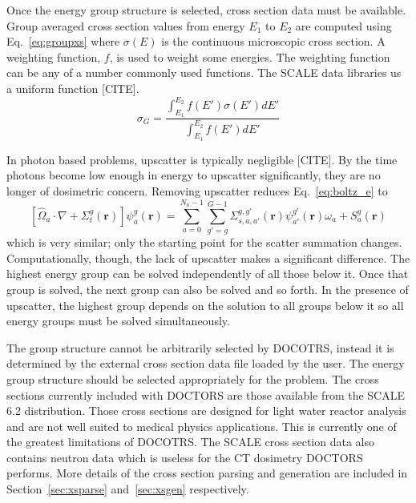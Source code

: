 Once the energy group structure is selected, cross section data must be available. Group averaged cross section values from energy $E_1$ to $E_2$ are computed using Eq.~\ref{eq:groupxs} where $\sigma(E)$ is the continuous microscopic cross section. A weighting function, $f$, is used to weight some energies. The weighting function can be any of a number commonly used functions. The SCALE data libraries us a uniform function [CITE].
\begin{equation}\label{eq:groupxs}
\sigma_G = \frac{\int_{E_1}^{E_2}f(E')\sigma(E') dE'}{\int_{E_1}^{E_2} f(E') dE'}
\end{equation}

In photon based problems, upscatter is typically negligible [CITE]. By the time photons become low enough in energy to upscatter significantly, they are no longer of dosimetric concern. Removing upscatter reduces Eq.~\ref{eq:boltz_e} to
\begin{equation} \label{eq:boltz_e2}
\left[ \hat{\Omega}_a \cdot \nabla + \Sigma_t^g(\boldsymbol{r}) \right]
\psi_{a}^{g}(\boldsymbol{r}) = 
\sum_{a=0}^{N_a-1} \sum_{g'=g}^{G-1} \Sigma_{s, a, a'}^{g, g'}(\boldsymbol{r}) \psi_{a'}^{g'}(\boldsymbol{r}) \omega_a + S_a^g(\boldsymbol{r})
\end{equation}
which is very similar; only the starting point for the scatter summation changes. Computationally, though, the lack of upscatter makes a significant difference. The highest energy group can be solved independently of all those below it. Once that group is solved, the next group can also be solved and so forth. In the presence of upscatter, the highest group depends on the solution to all groups below it so all energy groups must be solved simultaneously.

The group structure cannot be arbitrarily selected by DOCOTRS, instead it is determined by the external cross section data file loaded by the user. The energy group structure should be selected appropriately for the problem. The cross sections currently included with DOCTORS are those available from the SCALE 6.2 distribution. Those cross sections are designed for light water reactor analysis and are not well suited to medical physics applications. This is currently one of the greatest limitations of DOCOTRS. The SCALE cross section data also contains neutron data which is useless for the CT dosimetry DOCTORS performs. More details of the cross section parsing and generation are included in Section~\ref{sec:xsparse} and~\ref{sec:xsgen} respectively.

